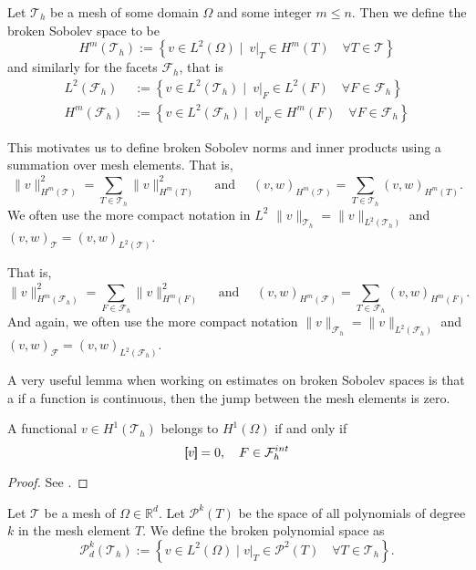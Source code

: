 \begin{definition}
Let $\mathcal{T}_{h} $ be a mesh of some domain $\Omega  $ and some integer $m\le n$. Then we define the broken Sobolev space to be \[
H^{m}( \mathcal{T}_{h} ) := \left\{ v \in L^2( \Omega )  \mid \ v|_{T} \in H^{m}( T) \quad     \forall T \in  \mathcal{T} \right\}
\]
and similarly for the facets $\mathcal{F}_{h} $, that is
\[
    \begin{split}
        L^{2}( \mathcal{F}_{h} ) &:= \left\{ v \in L^2( \mathcal{T}_{h}  )  \mid   \ v|_{F} \in L^{2}( F)  \quad  \forall F \in  \mathcal{F}_{h}   \right\} \\
        H^{m}( \mathcal{F}_{h} ) &:= \left\{ v \in L^2( \mathcal{F}_{h}  )  \mid   \ v|_{F} \in H^{m}( F)  \quad  \forall F \in  \mathcal{F}_{h}   \right\}
    \end{split}
\]
\end{definition}
This motivates us to define broken Sobolev norms and inner products using a summation over mesh elements. That is,
\[
 \| v \|_{H^{m}( \mathcal{T} ) }^{2} = \sum_{T \in  \mathcal{T}_{h} }^{} \| v  \|_{ H^{m}( T ) }^{2  } \quad \text{ and } \quad
 (v ,w )_{H^{m}( \mathcal{T} ) }^{} = \sum_{T \in \mathcal{T} _{h}}^{} (v ,w )_{ H^{m}( T ) }^{  } .
\]
We often use the more compact notation in $L^{2}$  $\| v \|_{\mathcal{T}_{h}} =  \| v \|_{L^{2}( \mathcal{T}_{h} ) }$ and  $(v ,w )_{ \mathcal{T} }^{} = (v ,w )_{L^2( \mathcal{T} ) }^{} $.

That is,
\[
 \| v \|_{H^{m}( \mathcal{F}_{h} ) }^{2} = \sum_{F \in  \mathcal{F}_{h} }^{} \| v  \|_{ H^{m}( F ) }^{2  } \quad \text{ and } \quad
 (v ,w )_{H^{m}( \mathcal{F} ) }^{} = \sum_{T \in \mathcal{F} _{h}}^{} (v ,w )_{ H^{m}( F ) }^{  } .
\]
And again, we often use the more compact notation $\| v \|_{\mathcal{F}_{h}} =  \| v \|_{L^{2}( \mathcal{F}_{h} ) }$ and  $(v ,w )_{ \mathcal{F} }^{} = (v ,w )_{L^2( \mathcal{F}_{h} ) }^{} $.


A very useful lemma when working on estimates on broken Sobolev spaces is that a if a function is continuous, then the jump between the mesh elements is zero.
\begin{lemma}
    A functional $ v \in  H^{1}( \mathcal{T}_{h} ) $ belongs to $ H^{1}( \Omega )  $ if and only if \[
    \left[\!\!\left[  v  \right]\!\!\right]   = 0, \quad F \in \mathcal{F}^{int}_{h}
    \]
\end{lemma}
\begin{proof}
    See \cite[Lemma 1.23]{pietro2012}.
\end{proof}


\begin{definition}
    Let $\mathcal{T} $ be a mesh of $\Omega \in \mathbb{R} ^{d} $. Let $\mathcal{P}^{k}(T) $ be the space of all polynomials of degree $k$ in the mesh element $T$. We define the broken polynomial space as \[
    \mathcal{P}^{k}_{d} ( \mathcal{T}_{h} ) := \left\{ v \in L^2( \Omega )  \mid  v|_{T} \in \mathcal{P}^2( T) \quad  \forall T \in  \mathcal{T}_{h}   \right\}.
    \]
\end{definition}







